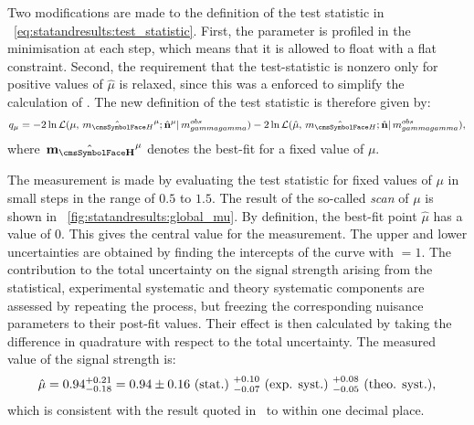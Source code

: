 Two modifications are made to the definition of the test statistic in \Eq~\ref{eq:statandresults:test_statistic}. First, the \mH parameter is profiled in the minimisation at each step, which means that it is allowed to float with a flat constraint. Second, the requirement that the test-statistic is nonzero only for positive values of $\hat{\mu}$ is relaxed, since this was a enforced to simplify the calculation of \pvalue\s. The new definition of the test statistic is therefore given by: 
\begin{equation}
\label{eq:statandresults:test_statistic_profMH}
q_{\mu} = -2 \ln \mathcal{L}(\mu,\hat{\mH}^{\mu} ; \hat{\mathbf{n}}^{\mu}| \mgg^{obs})- 2\ln\mathcal{L}(\hat{\mu},\hat{\mH} ;\hat{\mathbf{n}}| \mgg^{obs} ), 
\end{equation}
where $\hat{\mathbf{\mH}}^{\mu}$ denotes the best-fit \mH for a fixed value of $\mu$. %

The measurement is made by evaluating the test statistic for fixed values of $\mu$ in small steps in the range of $0.5$ to $1.5$. The result of the so-called \DNLL \emph{scan} of $\mu$ is shown in \Fig~\ref{fig:statandresults:global_mu}. By definition, the best-fit point $\hat{\mu}$ has a \DNLL value of $0$. This gives the central value for the measurement. The upper and lower uncertainties are obtained by finding the intercepts of the curve with \DNLL$=1$. 
The contribution to the total uncertainty on the signal strength arising from the statistical, experimental systematic and theory systematic components are assessed by repeating the process, but freezing the corresponding nuisance parameters to their post-fit values. Their effect is then calculated by taking the difference in quadrature with respect to the total uncertainty. 
The measured value of the signal strength is:
\begin{equation*}
\hat{\mu} = 0.94^{+0.21}_{-0.18} = 0.94 \pm 0.16 \text{~(stat.)~} ^{+0.10}_{-0.07} \text{~(exp. syst.)~} ^{+0.08}_{-0.05} \text{~(theo. syst.)},
\end{equation*}
which is consistent with the result quoted in~\cite{CMS-PAS-HIG-16-020} to within one decimal place. 

